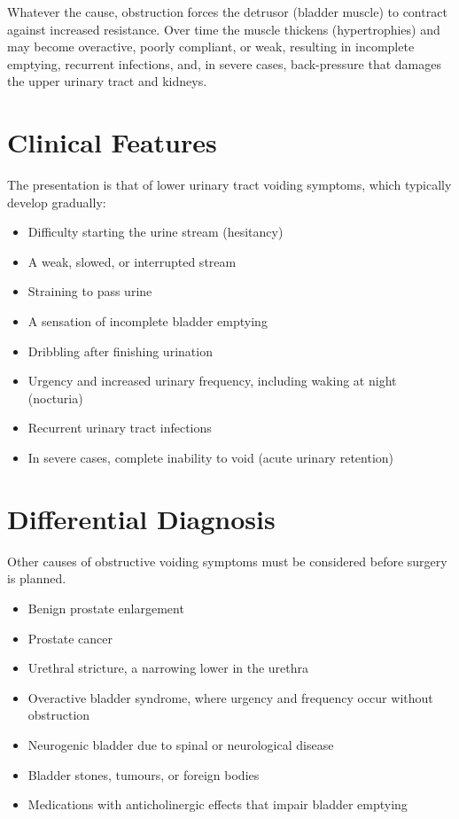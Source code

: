 Whatever the cause, obstruction forces the detrusor (bladder muscle) to contract against increased resistance. Over time the muscle thickens (hypertrophies) and may become overactive, poorly compliant, or weak, resulting in incomplete emptying, recurrent infections, and, in severe cases, back-pressure that damages the upper urinary tract and kidneys.

\section*{Clinical Features}
The presentation is that of lower urinary tract voiding symptoms, which typically develop gradually:

\begin{itemize}
    \item Difficulty starting the urine stream (hesitancy)
    \item A weak, slowed, or interrupted stream
    \item Straining to pass urine
    \item A sensation of incomplete bladder emptying
    \item Dribbling after finishing urination
    \item Urgency and increased urinary frequency, including waking at night (nocturia)
    \item Recurrent urinary tract infections
    \item In severe cases, complete inability to void (acute urinary retention)
\end{itemize}

\section*{Differential Diagnosis}
Other causes of obstructive voiding symptoms must be considered before surgery is planned.

\begin{itemize}
    \item Benign prostate enlargement
    \item Prostate cancer
    \item Urethral stricture, a narrowing lower in the urethra
    \item Overactive bladder syndrome, where urgency and frequency occur without obstruction
    \item Neurogenic bladder due to spinal or neurological disease
    \item Bladder stones, tumours, or foreign bodies
    \item Medications with anticholinergic effects that impair bladder emptying
\end{itemize}

